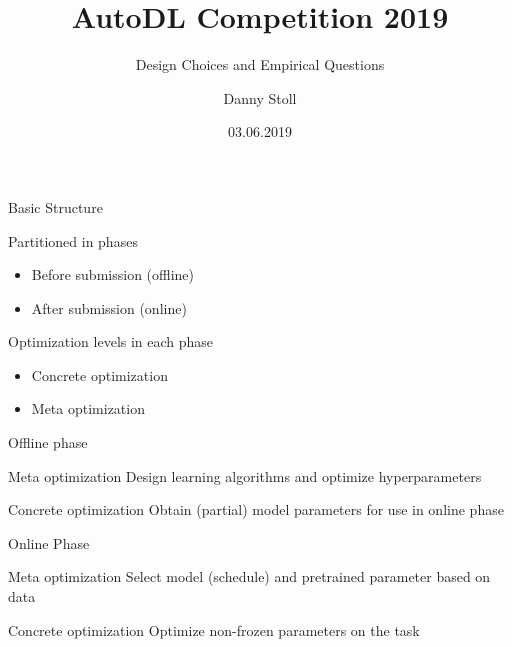\documentclass[aspectratio=169,12pt,handout]{beamer}
\title{AutoDL Competition 2019}
\subtitle{Design Choices and Empirical Questions}
\author{Danny Stoll}
\date{03.06.2019}
\begin{document}
\maketitle



\begin{frame}{Basic Structure}


\begin{block}{Partitioned in phases}
\begin{itemize}
    \item Before submission (offline)
    \item After submission (online)
\end{itemize}

\end{block}


\begin{block}{Optimization levels in each phase}
\begin{itemize}
    \item Concrete optimization
    \item Meta optimization
\end{itemize}
\end{block}


\end{frame}

\begin{frame}{Offline phase}

\begin{block}{Meta optimization}
    Design learning algorithms and optimize hyperparameters
\end{block}

\begin{block}{Concrete optimization}
    Obtain (partial) model parameters for use in online phase
\end{block}


\end{frame}



\begin{frame}{Online Phase}

\begin{block}{Meta optimization}
    Select model (schedule) and pretrained parameter based on data
\end{block}

\begin{block}{Concrete optimization}
    Optimize non-frozen parameters on the task
\end{block}



\end{frame}
\end{document}
